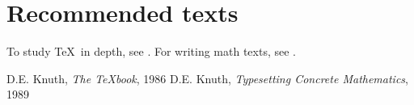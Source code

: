 \documentclass{article}
\begin{document}
\section*{Recommended texts}
To study \TeX\ in depth, see \cite{DK86}. For writing math texts,
see \cite{DK89}.
\begin{thebibliography}{8}
 D.E. Knuth, \emph{The {\TeX}book}, 1986
 D.E. Knuth, \emph{Typesetting Concrete
Mathematics}, 1989
\end{thebibliography}
\end{document}
